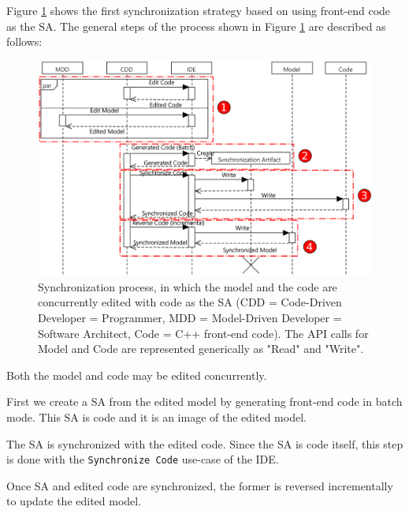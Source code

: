 Figure \ref{fig:scenario3} shows the first synchronization
strategy based on using front-end code as the SA.
The general steps of the process shown in Figure \ref{fig:scenario3} are described as follows:

\begin{figure}
	\centering
	\includegraphics[width = \columnwidth]{figures/scenario3_seq}
	\caption{Synchronization process, in which the model and the code are concurrently edited with code as the SA (CDD = Code-Driven Developer = Programmer, MDD = Model-Driven Developer = Software Architect, Code = C++ front-end code). The API calls for Model and Code are represented generically as "Read" and "Write".}
	\label{fig:scenario3}
\end{figure}

\begin{description}[\footnotesize]
	\item[Step 1] Both the model and code may be edited concurrently.
	\item[Step 2] First we create a SA from the edited model by generating front-end code in batch mode.
	This SA is code and it is an image of the edited model.	
	
	\item[Step 3] The SA is synchronized with the edited code. Since the SA
	is code itself, this step is done with the \texttt{Synchronize Code} use-case of the IDE.
	
	\item[Step 4] Once SA and edited code are synchronized, the former is reversed incrementally to update the edited model.
\end{description}

